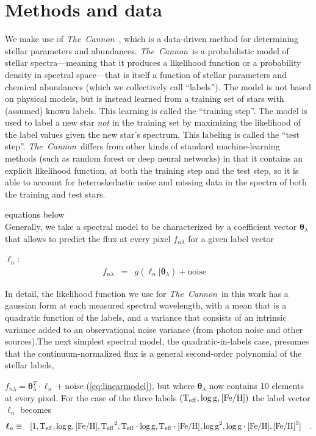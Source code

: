 \documentclass[12pt, preprint]{aastex}
\newcommand{\project}[1]{\textsl{#1}}
\newcommand{\tc}{\project{The~Cannon}}
\newcommand{\teff}{\mbox{$\rm T_{eff}$}}
\newcommand{\feh}{\mbox{$\rm [Fe/H]$}}
\newcommand{\logg}{\mbox{$\rm \log g$}}
\newcommand{\set}[1]{\bm{#1}}
\newcommand{\starlabel}{\ell}
\newcommand{\starlabelvec}{\set{\starlabel}}
\begin{document}
\section{Methods and data}

We make use of \tc\ \citep{Ness2015}, which is a data-driven method for
determining stellar parameters and abundances.
\tc\ is a probabilistic model of stellar spectra---meaning that it
produces a likelihood function or a probability density in spectral
space---that is itself a function of stellar parameters and chemical
abundances (which we collectively call ``labels'').
The model is not based on physical models, but is instead learned
from a training set of stars with (assumed) known labels.
This learning is called the ``training step''.
The model is used to label a new star \emph{not} in the training set
by maximizing the likelihood of the label values given the new star's
spectrum.
This labeling is called the ``test step''.
\tc\ differs from other kinds of standard machine-learning methods
(such as random forest or deep neural networks) in that it contains an
explicit likelihood function, at both the training step and the test
step, so it is able to account for heteroskedastic noise and missing
data in the spectra of both the training and test stars.

equations below \\

Generally, we take a spectral model to be characterized by a coefficient vector $\set{\theta}_\lambda$
that allows to predict the flux at every pixel $f_{n\lambda}$ for a given label vector 

$\starlabelvec_n$:
\begin{eqnarray}
f_{n\lambda} &=&
g(\starlabelvec_n |  \set{\theta}_\lambda) + \mbox{noise}
\label{eq:specmodel}\quad 
\end{eqnarray}

In detail, the likelihood function we use for \tc\ in this work has a
gaussian form at each measured spectral wavelength, with a mean that
is a quadratic function of the labels, and a variance that consists of
an intrinsic variance added to an observational noise variance (from
photon noise and other sources).The next simplest spectral model, the quadratic-in-labels case,
 presumes that the continuum-normalized flux is a general second-order polynomial of the stellar labels, 

$f_{n\lambda} =
\set{\theta}_\lambda^T \cdot \starlabelvec_n + \mbox{noise}$ 
(\ref{eq:linearmodel}), 
but where $\set{\theta}_\lambda$ now contains 10 elements at every pixel.
For the case of the three labels $(\teff , \logg , \feh)$ the label vector $\starlabelvec_n$
becomes  
\begin{eqnarray}
\starlabelvec_n &\equiv&
[1, \teff, \logg, \feh, \teff^2, \teff\cdot\logg, \teff\cdot\feh, \logg^2, \logg\cdot\feh, \feh^2]
 \label{eq:quadinthreelabels}\quad.
\end{eqnarray}
\end{document}
